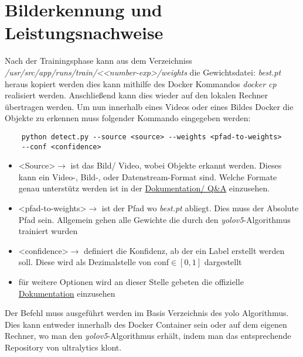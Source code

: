 \chapter{Bilderkennung und Leistungsnachweise}
Nach der Trainingsphase kann aus dem Verzeichniss \textit{/usr/src/app/runs/train/<\textless number-exp\textgreater/weights} die Gewichtsdatei: \textit{best.pt} heraus kopiert werden dies kann mithilfe des Docker Kommandos \textit{docker cp} realisiert werden. Anschließend kann dies wieder auf den lokalen Rechner übertragen werden. Um nun innerhalb eines Videos oder eines Bildes Docker die Objekte zu erkennen muss folgender Kommando eingegeben werden:
\begin{verbatim}
    python detect.py --source <source> --weights <pfad-to-weights> 
    --conf <confidence>
\end{verbatim}

\begin{itemize}
    \item \textless Source\textgreater $\rightarrow$ ist das Bild/ Video, wobei Objekte erkannt werden. Dieses kann ein Video-, Bild-, oder Datenstream-Format sind. Welche Formate genau unterstütz werden ist in der \href{https://github.com/ultralytics/yolov5/issues/6855}{Dokumentation/ Q\&A} einzusehen.
    \item \textless pfad-to-weights\textgreater $\rightarrow$ ist der Pfad wo \textit{best.pt} abliegt. Dies muss der Absolute Pfad sein. Allgemein gehen alle Gewichte die durch den \textit{\ac{yolo}v5}-Algorithmus trainiert wurden
    \item \textless confidence\textgreater  $\rightarrow$ definiert die Konfidenz, ab der ein Label erstellt werden soll. Diese wird als Dezimalstelle von conf$\in [0,1]$ dargestellt
    \item für weitere Optionen wird an dieser Stelle gebeten die offizielle \href{https://github.com/ultralytics/yolov5/blob/master/detect.py}{Dokumentation} einzusehen
\end{itemize}

Der Befehl muss ausgeführt werden im Basis Verzeichnis des \ac{yolo} Algorithmus. Dies kann entweder innerhalb des Docker Container sein oder auf dem eigenen Rechner, wo man den \textit{\ac{yolo}v5}-Algorithmus erhält, indem man das entsprechende Repository von ultralytics klont.